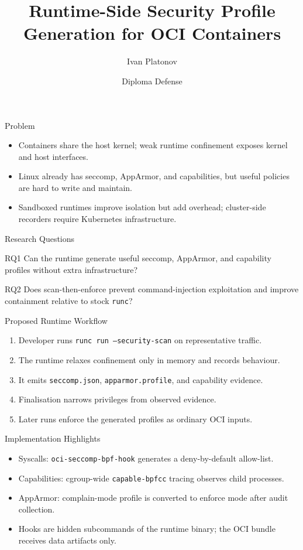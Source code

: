 \documentclass[aspectratio=169]{beamer}
\title[Runtime-Side Security Profiles]{Runtime-Side Security Profile Generation for OCI Containers}
\author{Ivan Platonov}
\institute{Innopolis University}
\date{Diploma Defense}
\begin{document}
\begin{frame}
  \titlepage
\end{frame}

\begin{frame}{Problem}
  \begin{itemize}
    \item Containers share the host kernel; weak runtime confinement exposes kernel and host interfaces.
    \item Linux already has seccomp, AppArmor, and capabilities, but useful policies are hard to write and maintain.
    \item Sandboxed runtimes improve isolation but add overhead; cluster-side recorders require Kubernetes infrastructure.
  \end{itemize}
\end{frame}

\begin{frame}{Research Questions}
  \begin{block}{RQ1}
    Can the runtime generate useful seccomp, AppArmor, and capability profiles without extra infrastructure?
  \end{block}
  \begin{block}{RQ2}
    Does scan-then-enforce prevent command-injection exploitation and improve containment relative to stock \texttt{runc}?
  \end{block}
\end{frame}

\begin{frame}{Proposed Runtime Workflow}
  \begin{enumerate}
    \item Developer runs \texttt{runc run --security-scan} on representative traffic.
    \item The runtime relaxes confinement only in memory and records behaviour.
    \item It emits \texttt{seccomp.json}, \texttt{apparmor.profile}, and capability evidence.
    \item Finalisation narrows privileges from observed evidence.
    \item Later runs enforce the generated profiles as ordinary OCI inputs.
  \end{enumerate}
\end{frame}

\begin{frame}{Implementation Highlights}
  \begin{itemize}
    \item Syscalls: \texttt{oci-seccomp-bpf-hook} generates a deny-by-default allow-list.
    \item Capabilities: cgroup-wide \texttt{capable-bpfcc} tracing observes child processes.
    \item AppArmor: complain-mode profile is converted to enforce mode after audit collection.
    \item Hooks are hidden subcommands of the runtime binary; the OCI bundle receives data artifacts only.
  \end{itemize}
\end{frame}
\end{document}
